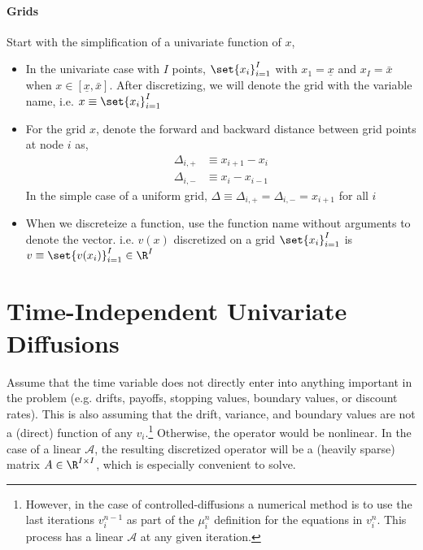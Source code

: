 \documentclass[11pt]{etk-article}
\begin{document}
\paragraph{Grids} Start with the simplification of a univariate function of $x$,
\begin{itemize}
	\item In the univariate case with $I$ points, $\set{x_i}_{i=1}^I$ with $x_1 = \underline{x}$ and $x_I = \bar{x}$ when $x \in [\underline{x}, \bar{x}]$.  After discretizing, we will denote the grid with the variable name, i.e. $x \equiv \set{x_i}_{i=1}^I$
\item For the grid $x$, denote the forward and backward distance between grid points at node $i$ as,
\begin{align}
	\Delta_{i,+} &\equiv x_{i+1} - x_i\label{eq:Delta-i-plus}\\
	\Delta_{i,-} &\equiv x_i - x_{i-1}\label{eq:Delta-i-minus}	
\end{align}
In the simple case of a uniform grid, $\Delta \equiv \Delta_{i,+} = \Delta_{i,-} = x_{i+1}$ for all $i$
\item When we discreteize a function, use the function name without arguments to denote the vector.  i.e. $v(x)$ discretized on a grid $\set{x_i}_{i=1}^{I}$ is $v \equiv \set{v(x_i)}_{i=1}^I \in \R^I$
\end{itemize}

\section{Time-Independent Univariate Diffusions}\label{sec:time-independent-univariate-diffusion}
Assume that the time variable does not directly enter into anything important in the problem (e.g. drifts, payoffs, stopping values, boundary values, or discount rates).  This is also assuming that the drift, variance, and boundary values are not a (direct) function of any $v_i$.\footnote{However, in the case of controlled-diffusions a numerical method is to use the last iterations $v^{n-1}_i$ as part of the $\mu^n_i$ definition for the equations in $v^n_i$.  This process has a linear $\mathcal{A}$ at any given iteration.}  Otherwise, the operator would be nonlinear.  In the case of a linear $\mathcal{A}$, the resulting discretized operator will be a (heavily sparse) matrix $A \in \R^{I \times I}$, which is especially convenient to solve.
\end{document}
